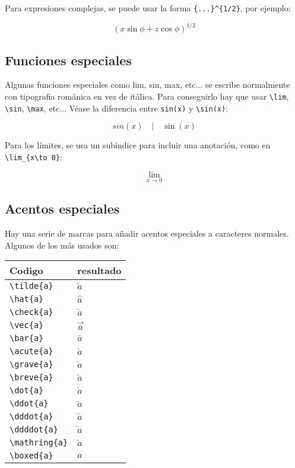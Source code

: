\documentclass[11pt]{article}
\begin{document}
Para expresiones complejas, se puede usar la forma
\texttt{\{...\}\^{}\{1/2\}}, por ejemplo:

\[ {\left(x \sin\phi + z \cos\phi\right)}^{1/2} \]

    \subsection{Funciones especiales}\label{funciones-especiales}

Algunas funciones especiales como lim, sin, max, etc... se escribe
normalmente con tipografia románica en vez de itálica. Para conseguirlo
hay que usar \texttt{\textbackslash{}lim}, \texttt{\textbackslash{}sin},
\texttt{\textbackslash{}max}, etc... Véase la diferencia entre
\texttt{sin(x)} y \texttt{\textbackslash{}sin(x)}:

\[ sin(x)  \quad | \quad \sin(x) \]

Para los límites, se usa un subíndice para incluir una anotación, como
en \texttt{\textbackslash{}lim\_\{x\textbackslash{}to\ 0\}}:

\[ \lim_{x\to 0} \]

    \subsection{Acentos especiales}\label{acentos-especiales}

Hay una serie de marcas para añadir acentos especiales a caracteres
normales. Algunos de los más usados son:

\begin{longtable}[c]{@{}ll@{}}
\toprule
Codigo & resultado\tabularnewline
\midrule
\endhead
\texttt{\textbackslash{}tilde\{a\}} & \(\tilde{a}\)\tabularnewline
\texttt{\textbackslash{}hat\{a\}} & \(\hat{a}\)\tabularnewline
\texttt{\textbackslash{}check\{a\}} & \(\check{a}\)\tabularnewline
\texttt{\textbackslash{}vec\{a\}} & \(\vec{a}\)\tabularnewline
\texttt{\textbackslash{}bar\{a\}} & \(\bar{a}\)\tabularnewline
\texttt{\textbackslash{}acute\{a\}} & \(\acute{a}\)\tabularnewline
\texttt{\textbackslash{}grave\{a\}} & \(\grave{a}\)\tabularnewline
\texttt{\textbackslash{}breve\{a\}} & \(\breve{a}\)\tabularnewline
\texttt{\textbackslash{}dot\{a\}} & \(\dot{a}\)\tabularnewline
\texttt{\textbackslash{}ddot\{a\}} & \(\ddot{a}\)\tabularnewline
\texttt{\textbackslash{}dddot\{a\}} & \(\dddot{a}\)\tabularnewline
\texttt{\textbackslash{}ddddot\{a\}} & \(\ddddot{a}\)\tabularnewline
\texttt{\textbackslash{}mathring\{a\}} & \(\mathring{a}\)\tabularnewline
\texttt{\textbackslash{}boxed\{a\}} & \(\boxed{a}\)\tabularnewline
\bottomrule
\end{longtable}
\end{document}
